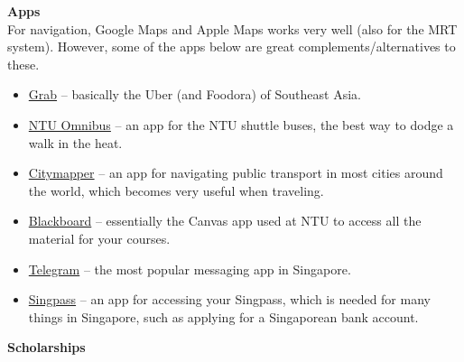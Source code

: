 \textbf{Apps}
\\[0.25cm]
For navigation, Google Maps and Apple Maps works very well (also for the MRT system). However, some of the apps below are great complements/alternatives to these.
\begin{itemize}
    \item \href{https://www.google.com/url?sa=t&source=web&rct=j&opi=89978449&url=https://apps.apple.com/sg/app/grab-taxi-ride-food-delivery/id647268330&ved=2ahUKEwjF8Z-HwM6NAxX3U1UIHRNmCeEQFnoECAsQAQ&usg=AOvVaw0dB-Vqdf1YjwezvtAhQq6H}{Grab} -- basically the Uber (and Foodora) of Southeast Asia.
    \item \href{https://www.google.com/url?sa=t&source=web&rct=j&opi=89978449&url=https://apps.apple.com/us/app/ntu-omnibus/id1636457987&ved=2ahUKEwiV0aGN46-KAxWHIxAIHXUHBg0QFnoECBsQAQ&usg=AOvVaw0nbsveDMT3B2KE9kmpcAZ_}{NTU Omnibus} -- an app for the NTU shuttle buses, the best way to dodge a walk in the heat.
    \item \href{https://citymapper.com/ios?cmpage=slash&cmlink=topnav&region_id=dk-copenhagen}{Citymapper} -- an app for navigating public transport in most cities around the world, which becomes very useful when traveling.
    \item \href{https://www.google.com/url?sa=t&source=web&rct=j&opi=89978449&url=https://apps.apple.com/sg/app/blackboard/id950424861&ved=2ahUKEwjR5Mj_w4GLAxUSyTgGHSk2PeEQFnoECBAQAQ&usg=AOvVaw2T7qh926fpN6z3PnP8uqkT}{Blackboard} -- essentially the Canvas app used at NTU to access all the material for your courses.
    \item \href{https://www.google.com/url?sa=t&source=web&rct=j&opi=89978449&url=https://apps.apple.com/us/app/telegram-messenger/id686449807&ved=2ahUKEwj0ksCUyc2LAxWazDgGHTttEz0QFnoECBYQAQ&usg=AOvVaw3whV8-0yYMcln1v7fxge7f}{Telegram} -- the most popular messaging app in Singapore.
    \item \href{https://www.google.com/url?sa=t&source=web&rct=j&opi=89978449&url=https://apps.apple.com/se/app/singpass/id1340660807&ved=2ahUKEwjU8fyHwc6NAxXaIxAIHctlNPIQFnoECB8QAQ&usg=AOvVaw3KrYhfL9kT4bAqZRZ4TscT}{Singpass} -- an app for accessing your Singpass, which is needed for many things in Singapore, such as applying for a Singaporean bank account.
\end{itemize}
\vspace{2cm}
\textbf{Scholarships}
